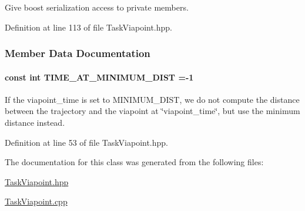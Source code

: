 Give boost serialization access to private members. 



Definition at line 113 of file Task\+Viapoint.\+hpp.



\subsubsection{Member Data Documentation}
\hypertarget{classDmpBbo_1_1TaskViapoint_a4cdb8b00e89770014fb33674de175a39}{
\paragraph[{T\+I\+M\+E\+\_\+\+A\+T\+\_\+\+M\+I\+N\+I\+M\+U\+M\+\_\+\+D\+I\+S\+T}]{\setlength{\rightskip}{0pt plus 5cm}const int T\+I\+M\+E\+\_\+\+A\+T\+\_\+\+M\+I\+N\+I\+M\+U\+M\+\_\+\+D\+I\+S\+T =-\/1\hspace{0.3cm}{\ttfamily [static]}}}\label{classDmpBbo_1_1TaskViapoint_a4cdb8b00e89770014fb33674de175a39}


If the viapoint\+\_\+time is set to M\+I\+N\+I\+M\+U\+M\+\_\+\+D\+I\+S\+T, we do not compute the distance between the trajectory and the viapoint at \char`\"{}viapoint\+\_\+time\char`\"{}, but use the minimum distance instead. 



Definition at line 53 of file Task\+Viapoint.\+hpp.



The documentation for this class was generated from the following files\+:\begin{DoxyCompactItemize}
\item 
\hyperlink{TaskViapoint_8hpp}{Task\+Viapoint.\+hpp}\item 
\hyperlink{TaskViapoint_8cpp}{Task\+Viapoint.\+cpp}\end{DoxyCompactItemize}
